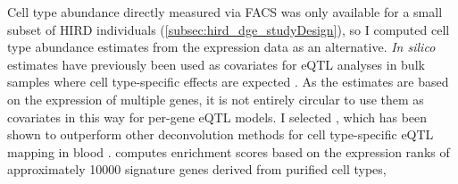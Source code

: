 Cell type abundance directly measured via \gls{FACS} was only available for a small subset of \gls{HIRD} individuals (\cref{subsec:hird_dge_studyDesign}), so I computed cell type abundance estimates from the expression data as an alternative.
\textit{In silico} estimates have previously been used as covariates for \gls{eQTL} analyses in bulk samples where cell type-specific effects are expected \autocite{westra2015CellSpecificEQTL,zhernakova2017IdentificationContextdependentExpression,davenport2018DiscoveringVivoCytokineeQTL,kim-hellmuth2020CellTypeSpecific}.
As the estimates are based on the expression of multiple genes, it is not entirely circular to use them as covariates in this way for per-gene \gls{eQTL} models.
%
%
%
%
I selected  \autocite{aran2017XCellDigitallyPortraying}, which has been shown to outperform other deconvolution methods for cell type-specific \gls{eQTL} mapping in blood \autocite{kim-hellmuth2020CellTypeSpecific}.
 computes enrichment scores based on the expression ranks of approximately \num{10000} signature genes derived from purified cell types,
